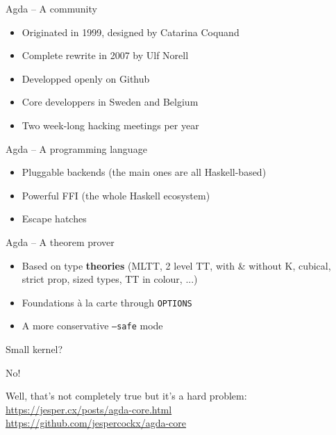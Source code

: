 \documentclass{beamer}
\begin{document}
\begin{frame}{Agda -- A community}
    \begin{itemize}
      \item<1-> Originated in 1999, designed by Catarina Coquand
      \item<2-> Complete rewrite in 2007 by Ulf Norell
      \item<3-> Developped openly on Github
      \item<4-> Core developpers in Sweden and Belgium
      \item<5-> Two week-long hacking meetings per year
    \end{itemize}
\end{frame}

\begin{frame}{Agda -- A programming language}
    \begin{itemize}
      \item<1-> Pluggable backends (the main ones are all Haskell-based)
      \item<2-> Powerful FFI (the whole Haskell ecosystem)
      \item<3-> Escape hatches
    \end{itemize}
\end{frame}

\begin{frame}{Agda -- A theorem prover}
  \begin{itemize}
    \item<1-> Based on type \textbf{theories} (MLTT, 2 level TT, with \& without K, cubical, strict prop, sized types, TT in colour, ...)
    \item<2-> Foundations à la carte through \texttt{OPTIONS}
    \item<3-> A more conservative \texttt{--safe} mode
  \end{itemize}


  \vfill
\end{frame}

\begin{frame}{Small kernel?}
  \begin{center}
    \Huge No!
  \end{center}

\vfill
Well, that's not completely true but it's a hard problem:\\
\url{https://jesper.cx/posts/agda-core.html}\\
\url{https://github.com/jespercockx/agda-core}
\end{frame}
\end{document}
